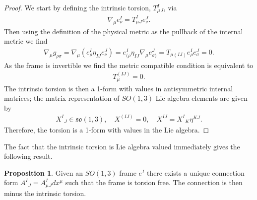 \documentclass[10pt]{report}
\theoremstyle{definition}
\newtheorem{proposition}{Proposition}[chapter]
\begin{document}
\begin{proof}
    We start by defining the intrinsic torsion, $T_\mu^I{}_J$, via 
    \begin{align}
        \nabla_\mu e^I_\nu = T_\mu^I{}_J e^J_\nu. \label{eq:so13-torsion-definition}
    \end{align}
    Then using the definition of the physical metric as the pullback of the internal metric we find 
    \begin{align}
        \nabla_\mu g_{\rho\sigma} = \nabla_\mu \left( e^I_\rho \eta_{IJ} e^J_\nu \right) = e^I_{(\rho} \eta_{IJ} \nabla_\mu e^J_{\sigma)} = T_{\mu(IJ)} e^I_\rho e^J_\sigma = 0.
    \end{align}
    As the frame is invertible we find the metric compatible condition is equivalent to
    \begin{align}
        T_\mu^{(IJ)} = 0.
    \end{align}
    The intrinsic torsion is then a 1-form with values in antisymmetric internal matrices; the matrix representation of $SO(1,3)$ Lie algebra elements are given by
    \begin{align}
        X^I{}_J \in \mathfrak{so}(1,3), \quad X^{(IJ)} = 0, \quad X^{IJ} = X^I{}_K \eta^{KJ}.
    \end{align}
    Therefore, the torsion is a 1-form with values in the Lie algebra.
\end{proof}
The fact that the intrinsic torsion is Lie algebra valued immediately gives the following result.
\begin{proposition}
    Given an $SO(1,3)$ frame $e^I$ there exists a unique connection form $A^I{}_J = A^I_\mu{}_J dx^\mu$ such that the frame is torsion free. The connection is then minus the intrinsic torsion.
\end{proposition}
\end{document}
